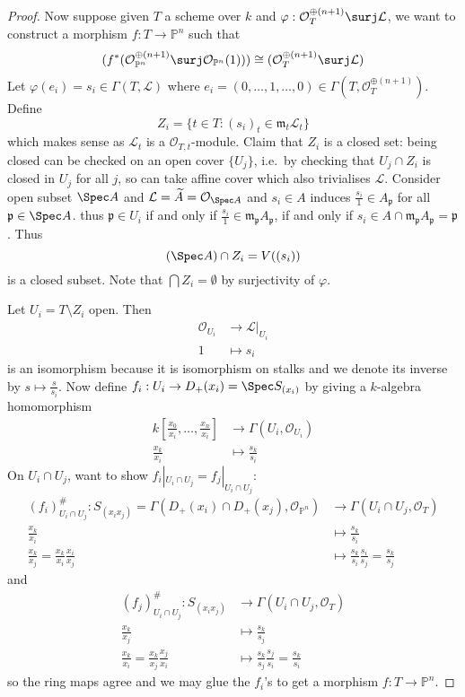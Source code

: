 \documentclass[a4paper]{article}
\renewcommand*{\P}{\mathbb{P}}
\newcommand{\sh}[1]{\mathcal{#1}} %
\begin{document}
\begin{proof}
  Now suppose given \(T\) a scheme over \(k\) and \(\varphi: \sh O_T^{\oplus(n + 1)} \surj \sh L\), we want to construct a morphism \(f: T \to \P^n\) such that
  \[
    (f^*(\sh O_{\P^n}^{\oplus(n + 1)} \surj \sh O_{\P^n}(1))) \cong (\sh O_T^{\oplus(n + 1)} \surj \sh L)
  \]
  Let \(\varphi(e_i) = s_i \in \Gamma(T, \sh L)\) where \(e_i = (0, \dots, 1, \dots, 0) \in \Gamma(T, \sh O_T^{\oplus(n + 1)})\). Define
  \[
    Z_i = \{t \in T: (s_i)_t \in \mathfrak m_t \sh L_t\}
  \]
  which makes sense as \(\sh L_t\) is a \(\sh O_{T, t}\)-module. Claim that \(Z_i\) is a closed set: being closed can be checked on an open cover \(\{U_j\}\), i.e.\ by checking that \(U_j \cap Z_i\) is closed in \(U_j\) for all \(j\), so can take affine cover which also trivialises \(\sh L\). Consider open subset \(\Spec A\) and \(\sh L = \widetilde A = \sh O_{\Spec A}\) and \(s_i \in A\) induces \(\frac{s_i}{1} \in A_{\mathfrak p}\) for all \(\mathfrak p \in \Spec A\). thus \(\mathfrak p \in U_i\) if and only if \(\frac{s_i}{1} \in \mathfrak m_{\mathfrak p} A_{\mathfrak p}\), if and only if \(s_i \in A \cap \mathfrak m_{\mathfrak p} A_{\mathfrak p} = \mathfrak p\). Thus
  \[
    (\Spec A) \cap Z_i = V((s_i))
  \]
  is a closed subset. Note that \(\bigcap Z_i = \emptyset\) by surjectivity of \(\varphi\).

  Let \(U_i = T\setminus Z_i\) open. Then
  \begin{align*}
    \sh O_{U_i} &\to \sh L|_{U_i} \\
    1 &\mapsto s_i
  \end{align*}
  is an isomorphism because it is isomorphism on stalks and we denote its inverse by \(s \mapsto \frac{s}{s_i}\). Now define \(f_i: U_i \to D_+(x_i) = \Spec S_{(x_i)}\) by giving a \(k\)-algebra homomorphism
  \begin{align*}
    k[\frac{x_0}{x_i}, \dots, \frac{x_n}{x_i}] &\to \Gamma(U_i, \sh O_{U_i}) \\
    \frac{x_k}{x_i} &\mapsto \frac{s_k}{s_i}
  \end{align*}
  On \(U_i \cap U_j\), want to show \(f_i|_{U_i \cap U_j} = f_j|_{U_i \cap U_j}\):
  \begin{align*}
    (f_i)_{U_i \cap U_j}^\#: S_{(x_i x_j)} = \Gamma(D_+(x_i) \cap D_+(x_j), \sh O_{\P^n}) &\to \Gamma(U_i \cap U_j, \sh O_T) \\
    \frac{x_k}{x_i} &\mapsto \frac{s_k}{s_i} \\
    \frac{x_k}{x_j} = \frac{x_k}{x_i} \frac{x_i}{x_j} &\mapsto \frac{s_k}{s_i} \frac{s_i}{s_j} = \frac{s_k}{s_j}
  \end{align*}
  and
  \begin{align*}
    (f_j)_{U_i \cap U_j}^\#: S_{(x_i x_j)} &\to \Gamma(U_i \cap U_j, \sh O_T) \\
    \frac{x_k}{x_j} &\mapsto \frac{s_k}{s_j} \\
    \frac{x_k}{x_i} = \frac{x_k}{x_j} \frac{x_j}{x_i} &\mapsto \frac{s_k}{s_j} \frac{s_j}{s_i} = \frac{s_k}{s_i}
  \end{align*}
  so the ring maps agree and we may glue the \(f_i\)'s to get a morphism \(f: T \to \P^n\).


\end{proof}
\end{document}
